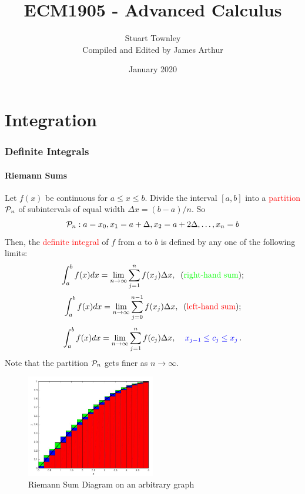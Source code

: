 \documentclass{article}
\title{ECM1905 - Advanced Calculus}
\author{Stuart Townley\\
Compiled and Edited by James Arthur}
\date{January 2020}
\begin{document}
\maketitle

\tableofcontents

\newpage

\part{Integration}
\section{Definite Integrals}
\subsection{Riemann Sums}
Let $f(x)$ be continuous for $a\leq x \leq b$. Divide the interval
$[a,b]$ into a \textcolor{red}{partition} ${\cal P}_n$ of subintervals of equal width $\Delta x=(b-a)/n$.  So
$$
{\cal P}_n: a = x_0, x_1= a + \Delta, x_2 = a+2\Delta, \ldots , x_n = b
$$
Then, the \textcolor{red}{definite integral} of $f$ from $a$ to $b$ is defined by any one of the following limits: 
$$
\int_a^b f(x) dx= \lim_{n \to \infty} \sum_{j=1}^{n} f(x_j) \Delta
x, \;\; (\mbox{\textcolor{green}{right-hand sum}});
$$
$$
\int_a^b f(x) dx= \lim_{n \to \infty} \sum_{j=0}^{n-1} f(x_j)
\Delta x, \;\; (\mbox{\textcolor{red}{left-hand sum}});
$$
$$
\int_a^b f(x) dx= \lim_{n \to \infty} \sum_{j=1}^{n} f(c_j) \Delta
x, \;\;  \;\;  \textcolor{blue}{x_{j-1} \leq c_j \leq x_{j}}\,.
$$
Note that the partition ${\cal P}_n$ gets finer as $n \rightarrow \infty$.

\begin{figure}[!ht]
\centering
\includegraphics[width=0.5\textwidth]{AC1.jpg}
\caption{Riemann Sum Diagram on an arbitrary graph}
\end{figure}
\end{document}
